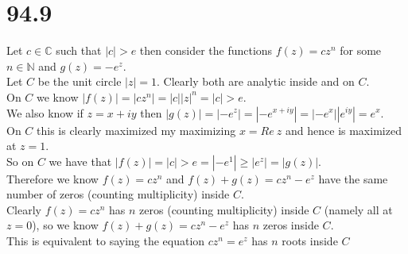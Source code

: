 \documentclass{article}
\begin{document}
\section*{94.9}
\begin{center}
    \doublespacing
    Let $c\in\mathbb{C}$ such that $|c| > e$ then consider the functions $f(z) = cz^n$ for some $n\in\mathbb{N}$ and $g(z) = -e^z$.
    \\Let $C$ be the unit circle $|z| = 1$. Clearly both are analytic inside and on $C$.
    \\On $C$ we know $|f(z)| = |cz^n| = |c||z|^n = |c| > e$.
    \\We also know if $z = x + iy$ then $|g(z)| = |-e^z| = |-e^{x+iy}| = |-e^x||e^{iy}| = e^x$.
    \\On $C$ this is clearly maximized my maximizing $x =Re\:z$ and hence is maximized at $z = 1$.
    \\So on $C$ we have that $|f(z)| = |c| > e = |-e^1|\geq |e^z| = |g(z)|$.
    \\Therefore we know $f(z) = cz^n$ and $f(z) + g(z) = cz^n - e^z$ have the same number of zeros (counting multiplicity) inside $C$.
    \\Clearly $f(z) = cz^n$ has $n$ zeros (counting multiplicity) inside $C$ (namely all at $z = 0$), so we know $f(z) + g(z) = cz^n - e^z$ has $n$ zeros inside $C$.
    \\This is equivalent to saying the equation $cz^n = e^z$ has $n$ roots inside $C$ \qedsymbol
\end{center}


\newpage
\end{document}
